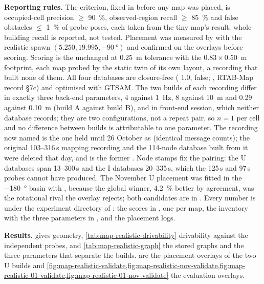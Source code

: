 \documentclass[11pt,a4paper,notitlepage]{report}
\begin{document}
\textbf{Reporting rules.} The criterion, fixed in
 before any map was placed, is occupied-cell
precision $\ge$ \SI{90}{\percent}, observed-region recall $\ge$ \SI{85}{\percent}
and false obstacles $\le$ \SI{1}{\percent} of probe poses, each taken from the
tiny map's result; whole-building recall is reported, not tested. Placement was
measured by  with the realistic spawn
$(5.250, 19.995, \SI{-90}{\degree})$ and confirmed on the overlays before
scoring. Scoring is the unchanged  at
\SI{0.25}{\metre} tolerance with the $0.83\times0.50$~m footprint, each map
probed by the static twin of its own layout, a recording that built none of
them. All four databases are closure-free ( 1.0,
 false; , RTAB-Map record
\S7c) and optimised with GTSAM. The two builds of each recording differ in
exactly three back-end parameters,  4 against
\SI{1}{\hertz},  8 against \SI{10}{\metre} and
 0.29 against \SI{0.10}{\metre} (build A against build B), and in front-end session, which neither database records; they are
two configurations, not a repeat pair, so $n=1$ per cell and no difference
between builds is attributable to one parameter. The recording now named
 is the one held until 26 October as
 (identical message counts); the original 103--316\,s mapping
recording and the 114-node database built from it were deleted that day, and
 is the former . Node stamps fix
the pairing: the U databases span 13--300\,s and the I databases 20--335\,s,
which the 125\,s and 97\,s probes cannot have produced. The November U
placement was fitted in the \SI{-180}{\degree} basin with ,
because the global winner, \SI{4.2}{\percent} better by agreement, was the
rotational rival the overlay rejects; both candidates are in
. Every number is under the
experiment directory  of
: the scores in
, one  per map, the
inventory with the three parameters in , and the
placement logs.

\textbf{Results.}  gives geometry,
\cref{tab:map-realistic-drivability} drivability against the independent
probes, and \cref{tab:map-realistic-graph} the stored graphs and the three
parameters that separate the builds.
 are the placement
overlays of the two U builds and
\cref{fig:map-realistic-validate,fig:map-realistic-nov-validate,fig:map-realistic-01-validate,fig:map-realistic-01-nov-validate}
the evaluation overlays.
\end{document}
